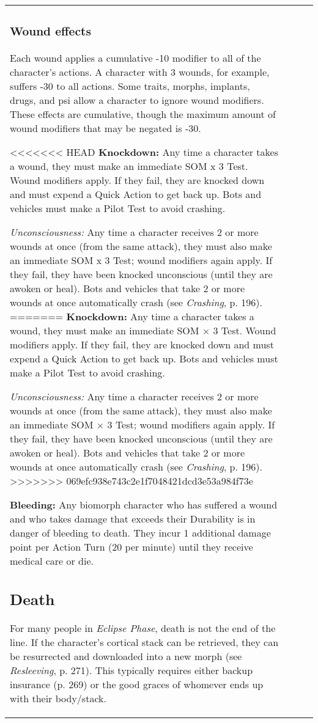 \begin{table}
\begin{tabular}{|p{8cm}|r|r|r|}
\subsubsection{Wound effects} 

Each wound applies a cumulative -10 modifier to all of the character’s actions. A character with 3 wounds, for example, suffers -30 to all actions. Some traits, morphs, implants, drugs, and psi allow a character to ignore wound modifiers. These effects are cumulative, though the maximum amount of wound modifiers that may be negated is -30. 

<<<<<<< HEAD \textbf{Knockdown:} Any time a character takes a wound, they must make an immediate SOM x 3 Test. Wound modifiers apply. If they fail, they are knocked down and must expend a Quick Action to get back up. Bots and vehicles must make a Pilot Test to avoid crashing. 

\emph{Unconsciousness:} Any time a character receives 2 or more wounds at once (from the same attack), they must also make an immediate SOM x 3 Test; wound modifiers again apply. If they fail, they have been knocked unconscious (until they are awoken or heal). Bots and vehicles that take 2 or more wounds at once automatically crash (see \emph{Crashing}, p. 196). ======= \textbf{Knockdown:} Any time a character takes a wound, they must make an immediate SOM $\times$ 3 Test. Wound modifiers apply. If they fail, they are knocked down and must expend a Quick Action to get back up. Bots and vehicles must make a Pilot Test to avoid crashing. 

\emph{Unconsciousness:} Any time a character receives 2 or more wounds at once (from the same attack), they must also make an immediate SOM $\times$ 3 Test; wound modifiers again apply. If they fail, they have been knocked unconscious (until they are awoken or heal). Bots and vehicles that take 2 or more wounds at once automatically crash (see \emph{Crashing}, p. 196). >>>>>>> 069efc938e743c2e1f7048421dcd3e53a984f73e 

\textbf{Bleeding:} Any biomorph character who has suffered a wound and who takes damage that exceeds their Durability is in danger of bleeding to death. They incur 1 additional damage point per Action Turn (20 per minute) until they receive medical care or die. 

\subsection{Death} For many people in \emph{Eclipse Phase}, death is not the end of the line. If the character’s cortical stack can be retrieved, they can be resurrected and downloaded into a new morph (see \emph{Resleeving}, p. 271). This typically requires either backup insurance (p. 269) or the good graces of whomever ends up with their body/stack. 


\end{tabular}
\end{table}
